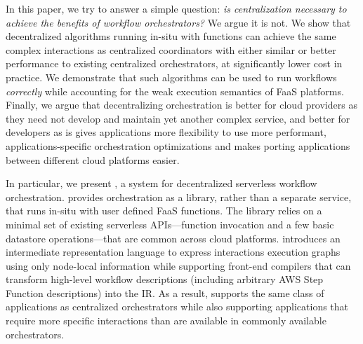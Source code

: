 

In this paper, we try to answer a simple question: \textit{is centralization
\emph{necessary} to achieve the benefits of workflow  orchestrators?} We argue
it is not. We show that decentralized algorithms running in-situ with functions
can achieve the same complex interactions as centralized coordinators with
either similar or better performance to existing centralized orchestrators, at
significantly lower cost in practice. We demonstrate that such algorithms can be
used to run workflows \emph{correctly} while accounting for the weak execution
semantics of FaaS platforms. Finally, we argue that decentralizing orchestration
is better for cloud providers as they need not develop and maintain yet another
complex service, and better for developers as is gives applications more
flexibility to use more performant, applications-specific orchestration
optimizations and makes porting applications between different cloud platforms
easier.

In particular, we present \name{}, a system for decentralized serverless
workflow orchestration. \name{} provides orchestration as a library, rather than
a separate service, that runs in-situ with user defined FaaS functions. The
library relies on a minimal set of existing serverless APIs---function
invocation and a few basic datastore operations---that are common across cloud
platforms. \name{} introduces an intermediate representation language to express
interactions execution graphs using only node-local information while supporting
front-end compilers that can transform high-level workflow descriptions
(including arbitrary AWS Step Function descriptions) into the IR. As a result,
\name{} supports the same class of applications as centralized orchestrators
while also supporting applications that require more specific interactions than
are available in commonly available orchestrators.

